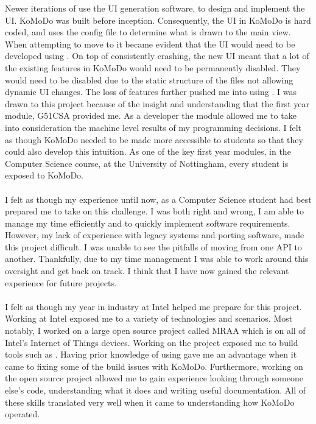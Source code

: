 %
Newer iterations of  use the UI generation software,  to design and implement the UI. KoMoDo was built before  inception. Consequently, the UI in KoMoDo is hard coded, and uses the  config file to determine what is drawn to the main view. When attempting to move to  it became evident that the UI would need to be developed using . On top of  consistently crashing, the new UI meant that a lot of the existing features in KoMoDo would need to be permanently disabled. They would need to be disabled due to the static structure of the  files not allowing dynamic UI changes. The loss of features further pushed me into using .
%
%
%
%
I was drawn to this project because of the insight and understanding that the first year module, G51CSA provided me. As a developer the module allowed me to take into consideration the machine level results of my programming decisions. I felt as though KoMoDo needed to be made more accessible to students so that they could also develop this intuition. As one of the key first year modules, in the Computer Science course, at the University of Nottingham, every student is exposed to KoMoDo.\\\\
%
I felt as though my experience until now, as a Computer Science student had best prepared me to take on this challenge. I was both right and wrong, I am able to manage my time efficiently and to quickly implement software requirements. However, my lack of experience with legacy systems and porting software, made this project difficult. I was unable to see the pitfalls of moving from one API to another. Thankfully, due to my time management I was able to work around this oversight and get back on track. I think that I have now gained the relevant experience for future projects.\\\\
%
I felt as though my year in industry at Intel helped me prepare for this project. Working at Intel exposed me to a variety of technologies and scenarios. Most notably, I worked on a large open source project called MRAA which is on all of Intel's Internet of Things devices. Working on the project exposed me to build tools such as . Having prior knowledge of using  gave me an advantage when it came to fixing some of the build issues with KoMoDo. Furthermore, working on the open source project allowed me to gain experience looking through someone else's code, understanding what it does and writing useful documentation. All of these skills translated very well when it came to understanding how KoMoDo operated.\\\\

